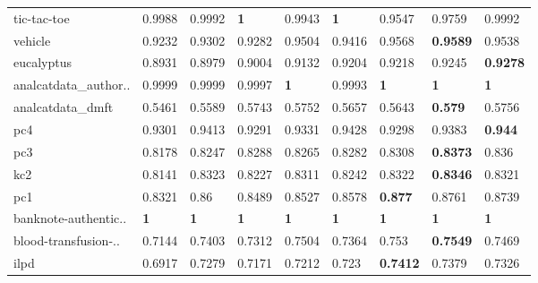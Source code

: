 \begin{tabular}{@{\hskip 0mm}
l@{\hskip 1mm}
l@{\hskip 1mm}
l@{\hskip 1mm}
l@{\hskip 1mm}
l@{\hskip 1mm}
l@{\hskip 1mm}
l@{\hskip 1mm}
l@{\hskip 1mm}
l@{\hskip 0mm}}
tic-tac-toe          &          0.9988 &          0.9992 &       \textbf{1} &           0.9943 &              \textbf{1} &           0.9547 &           0.9759 &                    0.9992 \\
vehicle              &          0.9232 &          0.9302 &           0.9282 &           0.9504 &                  0.9416 &           0.9568 &  \textbf{0.9589} &                    0.9538 \\
eucalyptus           &          0.8931 &          0.8979 &           0.9004 &           0.9132 &                  0.9204 &           0.9218 &           0.9245 &           \textbf{0.9278} \\
analcatdata\_author.. &          0.9999 &          0.9999 &           0.9997 &       \textbf{1} &                  0.9993 &       \textbf{1} &       \textbf{1} &                \textbf{1} \\
analcatdata\_dmft     &          0.5461 &          0.5589 &           0.5743 &           0.5752 &                  0.5657 &           0.5643 &   \textbf{0.579} &                    0.5756 \\
pc4                  &          0.9301 &          0.9413 &           0.9291 &           0.9331 &                  0.9428 &           0.9298 &           0.9383 &            \textbf{0.944} \\
pc3                  &          0.8178 &          0.8247 &           0.8288 &           0.8265 &                  0.8282 &           0.8308 &  \textbf{0.8373} &                     0.836 \\
kc2                  &          0.8141 &          0.8323 &           0.8227 &           0.8311 &                  0.8242 &           0.8322 &  \textbf{0.8346} &                    0.8321 \\
pc1                  &          0.8321 &            0.86 &           0.8489 &           0.8527 &                  0.8578 &   \textbf{0.877} &           0.8761 &                    0.8739 \\
banknote-authentic.. &      \textbf{1} &      \textbf{1} &       \textbf{1} &       \textbf{1} &              \textbf{1} &       \textbf{1} &       \textbf{1} &                \textbf{1} \\
blood-transfusion-.. &          0.7144 &          0.7403 &           0.7312 &           0.7504 &                  0.7364 &            0.753 &  \textbf{0.7549} &                    0.7469 \\
ilpd                 &          0.6917 &          0.7279 &           0.7171 &           0.7212 &                   0.723 &  \textbf{0.7412} &           0.7379 &                    0.7326 \\

\end{tabular}
